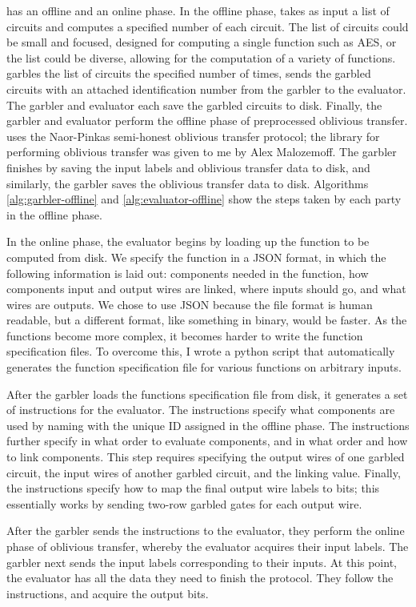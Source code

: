 \CompGC has an offline and an online phase. 
In the offline phase, \CompGC takes as input a list of circuits and computes a specified number of each circuit. 
The list of circuits could be small and focused, designed for computing a single function such as AES, or the list could be diverse, allowing for the computation of a variety of functions. 
\CompGC garbles the list of circuits the specified number of times, sends the garbled circuits with an attached identification number from the garbler to the evaluator. 
The garbler and evaluator each save the garbled circuits to disk. 
Finally, the garbler and evaluator perform the offline phase of preprocessed oblivious transfer. 
\CompGC uses the Naor-Pinkas semi-honest oblivious transfer protocol; the library for performing oblivious transfer was given to me by Alex Malozemoff. 
The garbler finishes by saving the input labels and oblivious transfer data to disk, and similarly, the garbler saves the oblivious transfer data to disk. 
Algorithms \ref{alg:garbler-offline} and \ref{alg:evaluator-offline} show the steps taken by each party in the offline phase. 

In the online phase, the evaluator begins by loading up the function to be computed from disk. 
We specify the function in a JSON format, in which the following information is laid out: components needed in the function, how components input and output wires are linked, where inputs should go, and what wires are outputs. 
We chose to use JSON because the file format is human readable, but a different format, like something in binary, would be faster. 
As the functions become more complex, it becomes harder to write the function specification files. 
To overcome this, I wrote a python script that automatically generates the function specification file for various functions on arbitrary inputs. 

After the garbler loads the functions specification file from disk, it generates a set of instructions for the evaluator. 
The instructions specify what components are used by naming with the unique ID assigned in the offline phase. 
The instructions further specify in what order to evaluate components, and in what order and how to link components. 
This step requires specifying the output wires of one garbled circuit, the input wires of another garbled circuit, and the linking value.
Finally, the instructions specify how to map the final output wire labels to bits; this essentially works by sending two-row garbled gates for each output wire. 

After the garbler sends the instructions to the evaluator, they perform the online phase of oblivious transfer, whereby the evaluator acquires their input labels. 
The garbler next sends the input labels corresponding to their inputs. 
At this point, the evaluator has all the data they need to finish the protocol. 
They follow the instructions, and acquire the output bits. 

